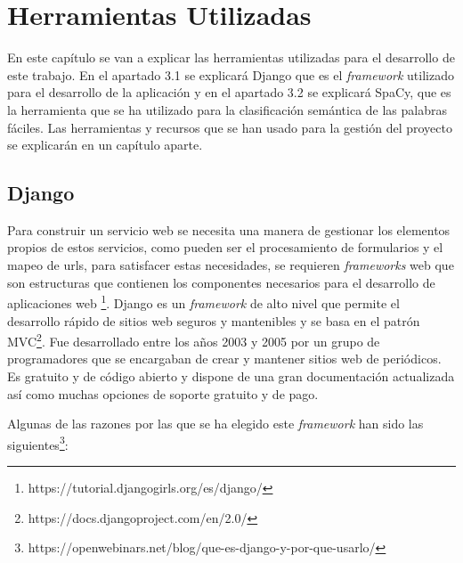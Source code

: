 \chapter{Herramientas Utilizadas}
\label{cap:herramientas}

En este capítulo se van a explicar las herramientas utilizadas para el desarrollo de este trabajo. En el apartado 3.1 se explicará Django que es el \textit{framework} utilizado para el desarrollo de la aplicación y en el apartado 3.2 se explicará SpaCy, que es la herramienta que se ha utilizado para la clasificación semántica de las palabras fáciles. Las herramientas y recursos que se han usado para la gestión del proyecto se explicarán en un capítulo aparte.


\section{Django}
\label{cap:sec:django}
Para construir un servicio web se necesita una manera de gestionar los elementos propios de estos servicios, como pueden ser el procesamiento de formularios y el mapeo de urls, para satisfacer estas necesidades, se requieren \textit{frameworks} web que son estructuras que contienen los componentes necesarios para el desarrollo de aplicaciones web \footnote{https://tutorial.djangogirls.org/es/django/}.
Django es un \textit{framework} de alto nivel que permite el desarrollo rápido de sitios web seguros y mantenibles y se basa en el patrón MVC\footnote{https://docs.djangoproject.com/en/2.0/}. Fue desarrollado entre los años 2003 y 2005 por un grupo de programadores que se encargaban de crear y mantener sitios web de periódicos. 
Es gratuito y de código abierto y dispone de una gran documentación actualizada así como muchas opciones de soporte gratuito y de pago. 

Algunas de las razones por las que se ha elegido este \textit{framework} han sido las siguientes\footnote{https://openwebinars.net/blog/que-es-django-y-por-que-usarlo/}:

